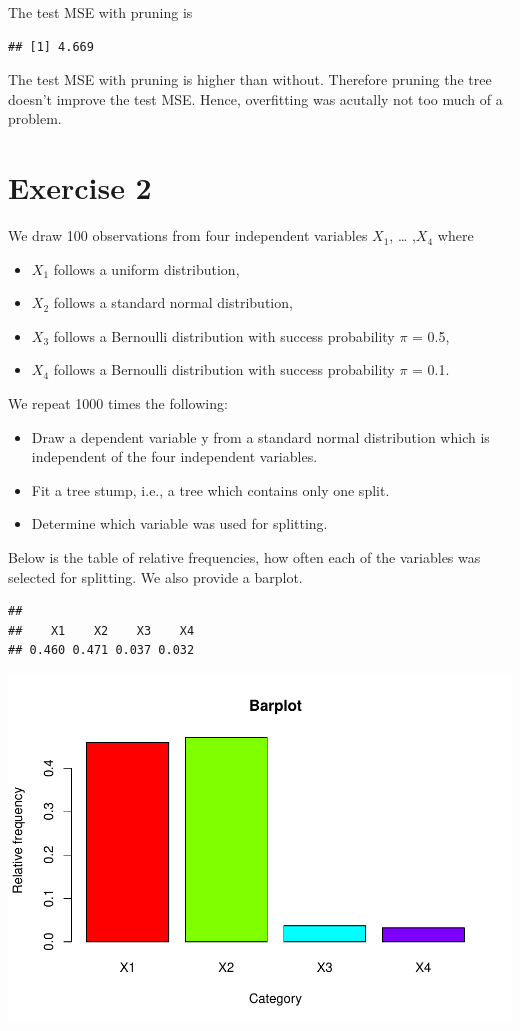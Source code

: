 \documentclass[
]{article}
\begin{document}
The test MSE with pruning is

\begin{verbatim}
## [1] 4.669
\end{verbatim}

The test MSE with pruning is higher than without. Therefore pruning the
tree doesn't improve the test MSE. Hence, overfitting was acutally not
too much of a problem.

\section{Exercise 2}\label{exercise-2}

We draw 100 observations from four independent variables \(X_1\),
\ldots{} ,\(X_4\) where

\begin{itemize}
  \item $X_1$ follows a uniform distribution,
  \item $X_2$ follows a standard normal distribution,
  \item $X_3$ follows a Bernoulli distribution with success probability $\pi$ = 0.5,
  \item $X_4$ follows a Bernoulli distribution with success probability $\pi$ = 0.1.
\end{itemize}

We repeat 1000 times the following:

\begin{itemize}
  \item Draw a dependent variable y from a standard normal distribution which is independent of the four independent variables.
  \item Fit a tree stump, i.e., a tree which contains only one split.
  \item Determine which variable was used for splitting.
\end{itemize}

Below is the table of relative frequencies, how often each of the
variables was selected for splitting. We also provide a barplot.

\begin{verbatim}
## 
##    X1    X2    X3    X4 
## 0.460 0.471 0.037 0.032
\end{verbatim}

\includegraphics{A3_files/figure-latex/unnamed-chunk-11-1.pdf}
\end{document}

